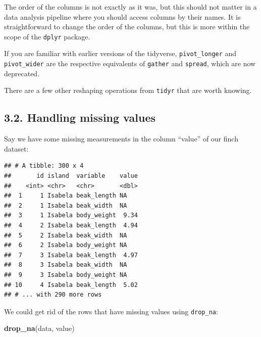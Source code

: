 \documentclass[]{book}
\newenvironment{Shaded}{}{}
\newcommand{\CommentTok}[1]{\textcolor[rgb]{0.38,0.63,0.69}{\textit{#1}}}
\newcommand{\DecValTok}[1]{\textcolor[rgb]{0.25,0.63,0.44}{#1}}
\newcommand{\KeywordTok}[1]{\textcolor[rgb]{0.00,0.44,0.13}{\textbf{#1}}}
\newcommand{\NormalTok}[1]{#1}
\newcommand{\OperatorTok}[1]{\textcolor[rgb]{0.40,0.40,0.40}{#1}}
\newcommand{\OtherTok}[1]{\textcolor[rgb]{0.00,0.44,0.13}{#1}}
\newcommand{\StringTok}[1]{\textcolor[rgb]{0.25,0.44,0.63}{#1}}
\begin{document}
The order of the columns is not exactly as it was, but this should not matter in a data analysis pipeline where you should access columns by their names. It is straightforward to change the order of the columns, but this is more within the scope of the \texttt{dplyr} package.

If you are familiar with earlier versions of the tidyverse, \texttt{pivot\_longer} and \texttt{pivot\_wider} are the respective equivalents of \texttt{gather} and \texttt{spread}, which are now deprecated.

There are a few other reshaping operations from \texttt{tidyr} that are worth knowing.

\hypertarget{handling-missing-values}{%
\subsection{3.2. Handling missing values}\label{handling-missing-values}}

Say we have some missing measurements in the column ``value'' of our finch dataset:

\begin{Shaded}
\end{Shaded}

\begin{verbatim}
## # A tibble: 300 x 4
##       id island  variable    value
##    <int> <chr>   <chr>       <dbl>
##  1     1 Isabela beak_length NA   
##  2     1 Isabela beak_width  NA   
##  3     1 Isabela body_weight  9.34
##  4     2 Isabela beak_length  4.94
##  5     2 Isabela beak_width  NA   
##  6     2 Isabela body_weight NA   
##  7     3 Isabela beak_length  4.97
##  8     3 Isabela beak_width  NA   
##  9     3 Isabela body_weight NA   
## 10     4 Isabela beak_length  5.02
## # ... with 290 more rows
\end{verbatim}

We could get rid of the rows that have missing values using \texttt{drop\_na}:

\begin{Shaded}
\begin{Highlighting}[]
\KeywordTok{drop_na}\NormalTok{(data, value)}
\end{Highlighting}
\end{Shaded}
\end{document}
